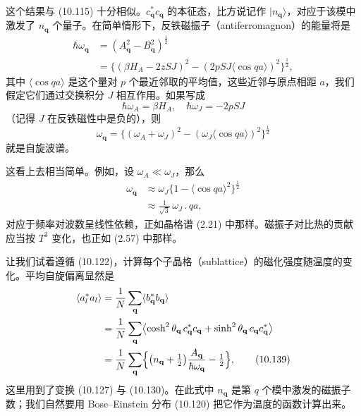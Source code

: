 这个结果与 (10.115) 十分相似。$c_{\mathbf{q}}^* c_{\mathbf{q}}$ 的本征态，比方说记作 $|n_{\mathbf{q}}\rangle$，对应于该模中激发了 $n_{\mathbf{q}}$ 个量子。在简单情形下，反铁磁振子（antiferromagnon）的能量将是
\begin{align*}
\hbar\omega_{\mathbf{q}} &= (A_{\mathbf{q}}^2 - B_{\mathbf{q}}^2)^{\frac{1}{2}} \\
&= \bigl\{ (\beta H_A - 2zSJ)^2 - (2pSJ\langle\cos qa\rangle)^2 \bigr\}^{\frac{1}{2}}, \tag{10.135}
\end{align*}
其中 $\langle\cos qa\rangle$ 是这个量对 $p$ 个最近邻取的平均值，这些近邻与原点相距 $a$，我们假定它们通过交换积分 $J$ 相互作用。如果写成
\begin{equation*}
\hbar\omega_A = \beta H_A, \quad \hbar\omega_J = -2pSJ \tag{10.136}
\end{equation*}
（记得 $J$ 在反铁磁性中是负的），则
\begin{equation*}
\omega_{\mathbf{q}} = \bigl\{ (\omega_A + \omega_J)^2 - (\omega_J\langle\cos qa\rangle)^2 \bigr\}^{\frac{1}{2}} \tag{10.137}
\end{equation*}
就是自旋波谱。

这看上去相当简单。例如，设 $\omega_A \ll \omega_J$，那么
\begin{align*}
\omega_{\mathbf{q}} &\approx \omega_J\bigl\{ 1 - \langle\cos qa\rangle^2 \bigr\}^{\frac{1}{2}} \\
&\approx \frac{1}{\sqrt{3}}\,\omega_J\, .\, qa, \tag{10.138}
\end{align*}
对应于频率对波数呈线性依赖，正如晶格谱 (2.21) 中那样。磁振子对比热的贡献应当按 $T^3$ 变化，也正如 (2.57) 中那样。

让我们试着遵循 (10.122)，计算每个子晶格（sublattice）的磁化强度随温度的变化。平均自旋偏离显然是
\begin{align*}
\langle a_l^* a_l\rangle &= \frac{1}{N}\sum_{\mathbf{q}} \langle b_{\mathbf{q}}^* b_{\mathbf{q}}\rangle \\
&= \frac{1}{N}\sum_{\mathbf{q}} \bigl\langle \cosh^2\theta_{\mathbf{q}}\, c_{\mathbf{q}}^* c_{\mathbf{q}} + \sinh^2\theta_{\mathbf{q}}\, c_{\mathbf{q}} c_{\mathbf{q}}^* \bigr\rangle \\
&= \frac{1}{N}\sum_{\mathbf{q}} \Bigl\{ \bigl(n_{\mathbf{q}} + \tfrac{1}{2}\bigr)\frac{A_{\mathbf{q}}}{\hbar\omega_{\mathbf{q}}} - \tfrac{1}{2} \Bigr\}, \tag{10.139}
\end{align*}
这里用到了变换 (10.127) 与 (10.130)。在此式中 $n_{\mathbf{q}}$ 是第 $q$ 个模中激发的磁振子数；我们自然要用 Bose–Einstein 分布 (10.120) 把它作为温度的函数计算出来。

